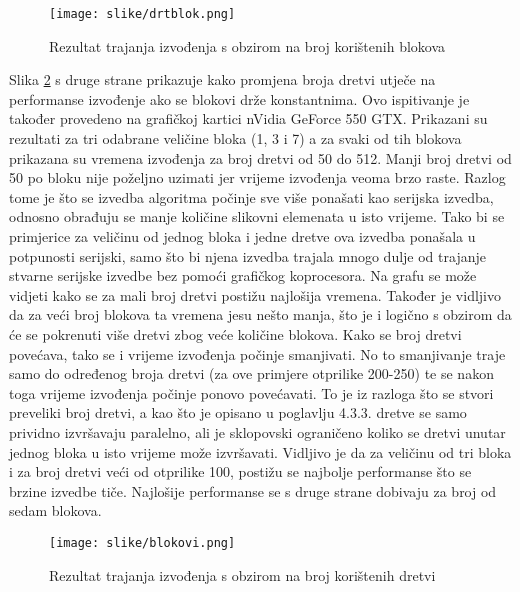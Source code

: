 \documentclass[times, utf8, zavrsni, numeric, sort]{fer}
\begin{document}
\begin{figure}[htb]
\centering
\texttt{[image: slike/drtblok.png]}
\caption{Rezultat trajanja izvođenja s obzirom na broj korištenih blokova}
\label{fig:blokovi}
\end{figure}



Slika \ref{fig:dretve} s druge strane prikazuje kako promjena broja dretvi utječe na performanse izvođenje ako se blokovi drže konstantnima. Ovo ispitivanje je također provedeno na grafičkoj kartici nVidia GeForce 550 GTX. Prikazani su rezultati za tri odabrane veličine bloka (1, 3 i 7) a za svaki od tih blokova prikazana su vremena izvođenja za broj dretvi od 50 do 512. Manji broj dretvi od 50 po bloku nije poželjno uzimati jer vrijeme izvođenja veoma brzo raste. Razlog tome je što se izvedba algoritma počinje sve više ponašati kao serijska izvedba, odnosno obrađuju se manje količine slikovni elemenata u isto vrijeme. Tako bi se primjerice za veličinu od jednog bloka i jedne dretve ova izvedba ponašala u potpunosti serijski, samo što bi njena izvedba trajala mnogo dulje od trajanje stvarne serijske izvedbe bez pomoći grafičkog koprocesora. Na grafu se može vidjeti kako se za mali broj dretvi postižu najlošija vremena. Također je vidljivo da za veći broj blokova ta vremena jesu nešto manja, što je i logično s obzirom da će se pokrenuti više dretvi zbog veće količine blokova. Kako se broj dretvi povećava, tako se i vrijeme izvođenja počinje smanjivati. No to smanjivanje traje samo do određenog broja dretvi (za ove primjere otprilike 200-250) te se nakon toga vrijeme izvođenja počinje ponovo povećavati. To je iz razloga što se stvori preveliki broj dretvi, a kao što je opisano u poglavlju 4.3.3. dretve se samo prividno izvršavaju paralelno, ali je sklopovski ograničeno koliko se dretvi unutar jednog bloka u isto vrijeme može izvršavati. Vidljivo je da za veličinu od tri bloka i za broj dretvi veći od otprilike 100, postižu se najbolje performanse što se brzine izvedbe tiče. Najlošije performanse se s druge strane dobivaju za broj od sedam blokova.



\begin{figure}[htb]
\centering
\texttt{[image: slike/blokovi.png]}
\caption{Rezultat trajanja izvođenja s obzirom na broj korištenih dretvi}
\label{fig:dretve}
\end{figure}
\end{document}
